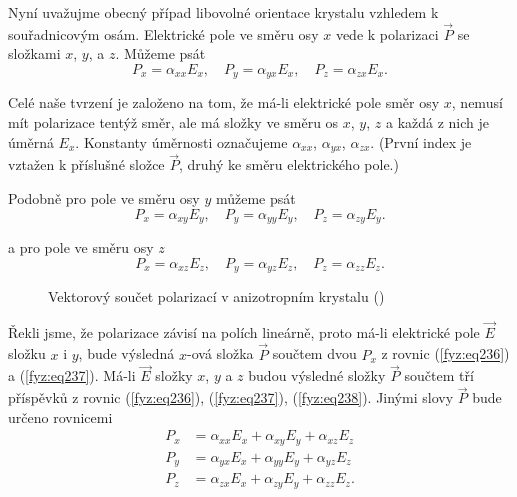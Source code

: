     Nyní uvažujme obecný případ libovolné orientace krystalu vzhledem k souřadnicovým osám.
    Elektrické pole ve směru osy \(x\) vede k polarizaci \(\vec{P}\) se složkami \(x\), \(y\), a
    \(z\). Můžeme psát
    \begin{equation}\label{fyz:eq236}
      P_x = \alpha_{xx}E_x, \quad P_y = \alpha_{yx}E_x, \quad  P_z = \alpha_{zx}E_x.
    \end{equation}

    Celé naše tvrzení je založeno na tom, že má-li elektrické pole směr osy \(x\), nemusí mít
    polarizace tentýž směr, ale má složky ve směru os \(x\), \(y\), \(z\) a každá z nich je úměrná
    \(E_x\). Konstanty úměrnosti označujeme \(\alpha_{xx}\), \(\alpha_{yx}\), \(\alpha_{zx}\).
    (První index je vztažen k příslušné složce \(\vec{P}\), druhý ke směru elektrického pole.) 
    
    Podobně pro pole ve směru osy \(y\) můžeme psát
    \begin{equation}\label{fyz:eq237}
      P_x = \alpha_{xy}E_y, \quad P_y = \alpha_{yy}E_y, \quad  P_z = \alpha_{zy}E_y.
    \end{equation}

    a pro pole ve směru osy \(z\)
    \begin{equation}\label{fyz:eq238}
      P_x = \alpha_{xz}E_z, \quad P_y = \alpha_{yz}E_z, \quad  P_z = \alpha_{zz}E_z.
    \end{equation}

    \begin{figure}[ht!]   %
      \centering
      \caption{Vektorový součet polarizací v anizotropním krystalu (\cite[s.~748]{Feynman02})}
      \label{fyz:fig0874}
    \end{figure}

    Řekli jsme, že polarizace závisí na polích lineárně, proto má-li elektrické pole \(\vec{E}\)
    složku \(x\) i \(y\), bude výsledná \(x\)-ová složka \(\vec{P}\) součtem dvou \(P_x\) z rovnic
    (\ref{fyz:eq236}) a (\ref{fyz:eq237}). Má-li \(\vec{E}\) složky \(x\), \(y\) a \(z\) budou
    výsledné složky \(\vec{P}\) součtem tří příspěvků z rovnic (\ref{fyz:eq236}),
    (\ref{fyz:eq237}), (\ref{fyz:eq238}). Jinými slovy \(\vec{P}\) bude určeno rovnicemi
    \begin{align}\label{fyz:eq240}
      P_x &= \alpha_{xx}E_x + \alpha_{xy}E_y + \alpha_{xz}E_z  \nonumber \\
      P_y &= \alpha_{yx}E_x + \alpha_{yy}E_y + \alpha_{yz}E_z            \\
      P_z &= \alpha_{zx}E_x + \alpha_{zy}E_y + \alpha_{zz}E_z. \nonumber
    \end{align}

